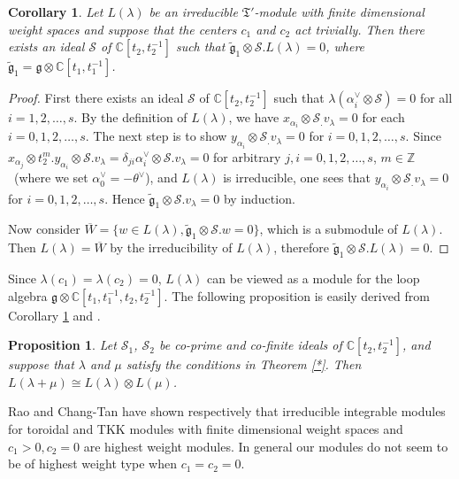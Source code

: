 \documentclass[11pt]{amsproc}
\newtheorem{proposition}{Proposition}[section]
\newtheorem{corollary}[theorem]{Corollary}
\theoremstyle{definition}
\theoremstyle{remark}
\numberwithin{equation}{section} \errorcontextlines=0
\begin{document}
\begin{corollary}\label{13}
Let $L(\lambda)$ be an irreducible ${\mathfrak T'}$-module with
finite dimensional weight spaces and suppose that the centers $c_1$ and $c_2$
act trivially. Then there exists an ideal $\mathcal {S}$ of $\mathbb
C[t_2, t_2^{-1}]$ such that $\widetilde{\mathfrak{g}}_1\otimes
\mathcal {S}.L(\lambda)=0$, where
$\widetilde{\mathfrak{g}}_1=\mathfrak{g}\otimes\mathbb{C}[t_1,t_1^{-1}]$.

\end{corollary}
\begin{proof}
First there exists an ideal $\mathcal S$ of
$\mathbb{C}[t_2,t_2^{-1}]$ such that $\lambda(\alpha_i^{\vee}\otimes
\mathcal {S})= 0$ for all $i=1,2,\ldots,s$. By the definition of
$L(\lambda)$, we have $x_{\alpha_i}\otimes \mathcal
{S}_{.}v_{\lambda}= 0$ for each $i=0,1,2,\ldots,s$. The next step is
to show $y_{\alpha_{i}}\otimes \mathcal {S}_.v_{\lambda}= 0$ for
$i=0,1,2,\ldots,s$. Since $x_{\alpha_j}\otimes t_2^m.
y_{\alpha_i}\otimes \mathcal
{S}.v_{\lambda}=\delta_{ji}\alpha_i^{\vee}\otimes \mathcal
{S}.v_{\lambda}= 0$ for arbitrary $j,i=0,1,2,\ldots,s$,
$m\in\mathbb{Z}$~(where we set $\alpha_0^{\vee}=-\theta^{\vee}$),
and $L(\lambda)$ is irreducible, one sees that
$y_{\alpha_i}\otimes \mathcal {S}_.v_{\lambda}= 0$ for
$i=0,1,2,\ldots,s$. Hence $\widetilde{\mathfrak{g}}_1\otimes
\mathcal {S}.v_{\lambda}=0$ by induction.

Now consider $\overline{W}=\{w\in L(\lambda),\widetilde{\mathfrak{g}}_1
\otimes \mathcal {S}.w=0 \}$, which is a submodule of $L(\lambda)$.
Then $L(\lambda)=\overline{W}$ by the irreducibility of
$L(\lambda)$, therefore $\widetilde{\mathfrak{g}}_1\otimes \mathcal
{S}.L(\lambda)=0$.
\end{proof}

Since ${\lambda}(c_1)={\lambda}(c_2)=0$, $L(\lambda)$ can be
viewed as a module for the loop algebra $\mathfrak{g}\otimes
\mathbb{C}[t_1,t_1^{-1},t_2,t_2^{-1}]$.
The following
proposition is easily derived from Corollary \ref{13} and \cite[Prop. 3.8]{RF}.

\begin{proposition} Let $\mathcal {S}_1$, $\mathcal {S}_2$ be co-prime and co-finite ideals
of $\mathbb C[t_2, t_2^{-1}]$, and suppose that $\lambda$ and $\mu$ satisfy the
conditions in Theorem \ref{*}. Then $L(\lambda+\mu)\cong
L(\lambda)\otimes L(\mu)$.
\end{proposition}

Rao \cite{SE1} and Chang-Tan \cite{CT}
have shown respectively that irreducible integrable modules for toroidal and TKK modules
with finite dimensional weight spaces and $c_1>0, c_2=0$ are highest weight
modules. In general our modules do not seem to be of highest weight type when $c_1=c_2=0$.
\end{document}
